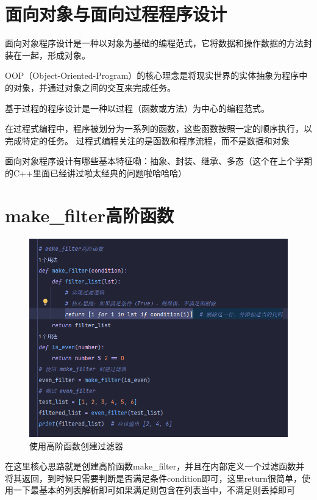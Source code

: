 \documentclass[10pt]{article}
\begin{document}
\section{面向对象与面向过程程序设计}
面向对象程序设计是一种以对象为基础的编程范式，它将数据和操作数据的方法封装在一起，形成对象。\par
OOP（Object-Oriented-Program）的核心理念是将现实世界的实体抽象为程序中的对象，并通过对象之间的交互来完成任务。\par
基于过程的程序设计是一种以过程（函数或方法）为中心的编程范式。\par
在过程式编程中，程序被划分为一系列的函数，这些函数按照一定的顺序执行，以完成特定的任务。
过程式编程关注的是函数和程序流程，而不是数据和对象\par

面向对象程序设计有哪些基本特征嘞：抽象、封装、继承、多态（这个在上个学期的C++里面已经讲过啦太经典的问题啦哈哈哈）


\section{make\_filter高阶函数}
\begin{figure}[H]
	\centering
	\includegraphics[scale=0.9]{过滤器}
	\caption{使用高阶函数创建过滤器}
\end{figure}
在这里核心思路就是创建高阶函数make\_filter，并且在内部定义一个过滤函数并将其返回，到时候只需要判断是否满足条件condition即可，这里return很简单，使用一下最基本的列表解析即可如果满足则包含在列表当中，不满足则丢掉即可
\end{document}
